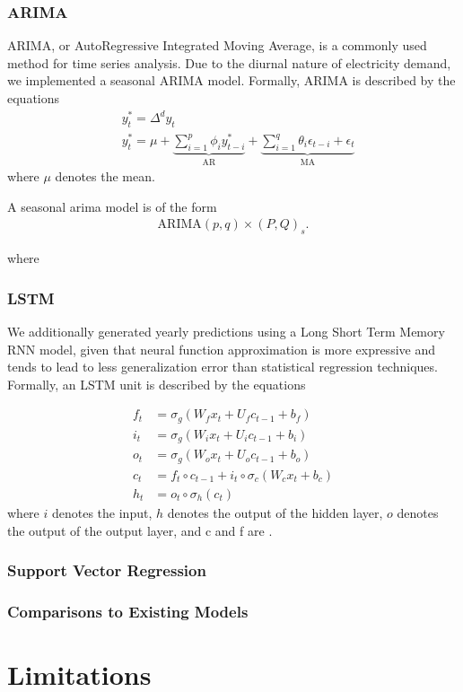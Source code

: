 \documentclass[plain]{article}
\newcommand{\1}{\mathbbm{1}}
\begin{document}
\subsubsection{ARIMA}
ARIMA, or AutoRegressive Integrated Moving Average, is a commonly used method for time series analysis. Due to the diurnal nature of electricity demand, we implemented a seasonal ARIMA model. Formally, ARIMA is described by the equations
\begin{align}
&y_{t}^{*}=\Delta^{d} y_{t} \\
&y_{t}^{*}=\mu+\underbrace{\sum_{i=1}^{p} \phi_{i} y_{t-i}^{*}}_{\mathrm{AR}}+\underbrace{\sum_{i=1}^{q} \theta_{i} \epsilon_{t-i}+\epsilon_{t}}_{\mathrm{MA}}
\end{align}
where $\mu$ denotes the mean.

A seasonal arima model is of the form 
\begin{align}
	\text{ARIMA}(p,q) \times (P,Q)_s
.\end{align}


where 

\subsubsection{LSTM}
We additionally generated yearly predictions using a Long Short Term Memory RNN model, given that neural function approximation is more expressive and tends to lead to less generalization error than statistical regression techniques. Formally, an LSTM unit is described by the equations

\begin{align}
f_{t} &=\sigma_{g}\left(W_{f} x_{t}+U_{f} c_{t-1}+b_{f}\right) \\
i_{t} &=\sigma_{g}\left(W_{i} x_{t}+U_{i} c_{t-1}+b_{i}\right) \\
o_{t} &=\sigma_{g}\left(W_{o} x_{t}+U_{o} c_{t-1}+b_{o}\right) \\
c_{t} &=f_{t} \circ c_{t-1}+i_{t} \circ \sigma_{c}\left(W_{c} x_{t}+b_{c}\right) \\
h_{t} &=o_{t} \circ \sigma_{h}\left(c_{t}\right)
\end{align}
where $i$ denotes the input, $h$ denotes the output of the hidden layer, $o$ denotes the output of the output layer, and c and f are .
\subsubsection{Support Vector Regression}

\subsubsection{Comparisons to Existing Models}


\section{Limitations}

\end{document}
